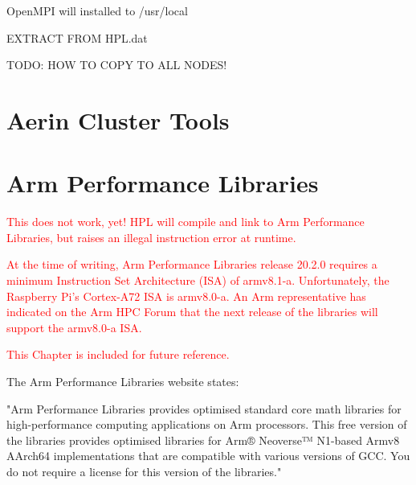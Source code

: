 \documentclass{report}
\begin{document}
OpenMPI will installed to /usr/local

EXTRACT FROM HPL.dat


TODO: HOW TO COPY TO ALL NODES!


%
%
\chapter{Aerin Cluster Tools}








%
%

\chapter{Arm Performance Libraries}

\textcolor{red}{This does not work, yet! HPL will compile and link to Arm Performance Libraries, but raises an illegal instruction error at runtime.}

\textcolor{red}{At the time of writing, Arm Performance Libraries release 20.2.0 requires a minimum Instruction Set Architecture (ISA) of armv8.1-a. Unfortunately, the Raspberry Pi's Cortex-A72 ISA is armv8.0-a. An Arm representative has indicated on the Arm HPC Forum that the next release of the libraries will support the armv8.0-a ISA.}

\textcolor{red}{This Chapter is included for future reference.}

The Arm Performance Libraries website states:

"Arm Performance Libraries provides optimised standard core math libraries for high-performance computing applications on Arm processors. This free version of the libraries provides optimised libraries for Arm® Neoverse™ N1-based Armv8 AArch64 implementations that are compatible with various versions of GCC. You do not require a license for this version of the libraries."
\end{document}
